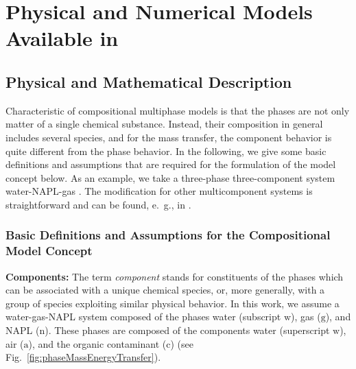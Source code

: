 \section[The \Dumux Models]{Physical and Numerical Models Available in \Dumux}

\subsection{Physical and Mathematical Description}

Characteristic of compositional multiphase models is that the phases
are not only matter of a single chemical substance. Instead, their
composition in general includes several species, and for the mass transfer,
the component behavior is quite different from the phase behavior. In the following, we
give some basic definitions and assumptions that are required for the
formulation of the model concept below. As an example, we take a
three-phase three-component system water-NAPL-gas
\cite{A3:class:2002a}. The modification for other multicomponent
systems is straightforward and can be found, e.\ g., in
\cite{A3:bielinski:2006,A3:acosta:2006}.

\subsubsection{Basic Definitions and Assumptions for the Compositional
  Model Concept}
\textbf{Components:}
The term {\it component} stands for constituents of the phases which
can be associated with a unique chemical species, or, more generally, with
a group of species exploiting similar physical behavior. In this work, we
assume a water-gas-NAPL system composed of the phases water (subscript
$\text{w}$), gas ($\text{g}$), and NAPL ($\text{n}$). These phases are
composed of the components water (superscript $\text{w}$), air
($\text{a}$), and the organic contaminant ($\text{c}$) (see Fig.\
\ref{fig:phaseMassEnergyTransfer}).

